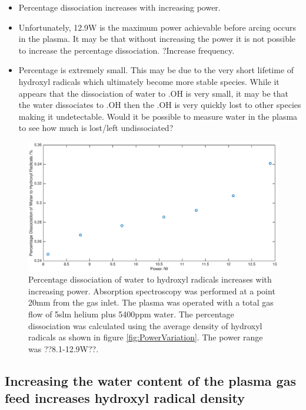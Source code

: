 \documentclass[11pt, oneside]{article}   	%
\begin{document}
\begin{itemize}
    \item Percentage dissociation increases with increasing power.
    \item Unfortunately, 12.9W is the maximum power achievable before arcing occurs in the plasma. It may be that without increasing the power it is not possible to increase the percentage dissociation. ?Increase frequency.
    \item Percentage is extremely small. This may be due to the very short lifetime of hydroxyl radicals which ultimately become more stable species. While it appears that the dissociation of water to .OH is very small, it may be that the water dissociates to .OH then the .OH is very quickly lost to other species making it undetectable. Would it be possible to measure water in the plasma to see how much is lost/left undissociated?
\end{itemize}

\begin{figure}
    \centering
    \includegraphics[width=\textwidth]{Figures/PowerDissociation.eps}
    \caption{Percentage dissociation of water to hydroxyl radicals increases with increasing power. Absorption spectroscopy was performed at a point 20mm from the gas inlet. The plasma was operated with a total gas flow of 5slm helium plus 5400ppm water. The percentage dissociation was calculated using the average density of hydroxyl radicals as shown in figure \ref{fig:PowerVariation}. The power range was ??8.1-12.9W??.}
    \label{fig:PowerDissociation}
\end{figure}

\subsection{Increasing the water content of the plasma gas feed increases hydroxyl radical density}
\end{document}
